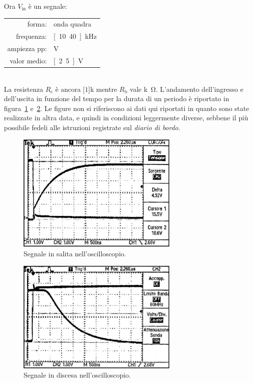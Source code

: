 \documentclass[italian,a4paper]{article}
\begin{document}
Ora $V_{\text{in}}$ è un segnale:
\begin{table}[h]
    \centering
    \begin{tabular}{rl}
        forma: & onda quadra\\
        frequenza: & \unit[10.40]{kHz}\\
        ampiezza pp: & \unit[5]{V}\\
        valor medio: & \unit[2.5]{V}
    \end{tabular}
\end{table}\\
La resistenza $R_{\text{c}}$ è ancora \unit[$1$]{k\ohm} mentre $R_{\text{b}}$ vale \unit[330]{k\ohm}. L'andamento
dell'ingresso e dell'uscita in funzione del tempo per la durata di un
periodo è riportato in figura~\ref{fig:vinvout1} e~\ref{fig:vinvout2}. Le
figure non si riferiscono ai dati qui
riportati in quanto sono state realizzate in altra data, e quindi in
condizioni leggermente diverse, sebbene il più possibile fedeli alle
istruzioni registrate sul \emph{diario di bordo}.
\begin{figure}[h]
    \begin{center}
    \caption{Segnale in salita nell'oscilloscopio.}
    \label{fig:vinvout1}
        \includegraphics[width=0.7\textwidth]{salita.eps}
    \end{center}
\end{figure}
\begin{figure}[h]
    \begin{center}
    \caption{Segnale in discesa nell'oscilloscopio.}
    \label{fig:vinvout2}
        \includegraphics[width=0.7\textwidth]{discesa.eps}
    \end{center}
\end{figure}\\
\end{document}
